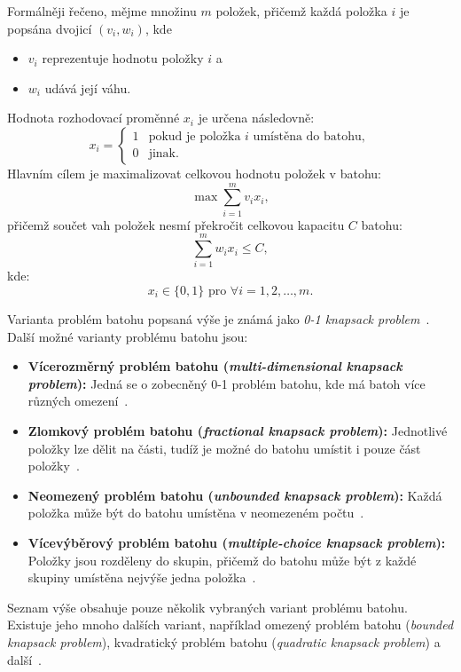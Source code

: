 Formálněji řečeno, mějme množinu $m$ položek, přičemž každá položka $i$ je popsána dvojicí $\left( v_i, w_i \right)$, kde
\begin{itemize}
    \item $v_i$ reprezentuje hodnotu položky $i$ a
    \item $w_i$ udává její váhu.
\end{itemize}
Hodnota rozhodovací proměnné $x_i$ je určena následovně:
\begin{equation*}
    x_i =
    \begin{cases}
        1 & \text{pokud je položka } i \text{ umístěna do batohu}, \\
        0 & \text{jinak}.
    \end{cases}    
\end{equation*}
Hlavním cílem je maximalizovat celkovou hodnotu položek v batohu:
\begin{equation*}
    \max \sum_{i=1}^{m} v_i x_i,
\end{equation*}
přičemž součet vah položek nesmí překročit celkovou kapacitu $C$ batohu:
\begin{equation} \label{eq:knapsack-capacity}
    \sum_{i=1}^{m} w_i x_i \leq C,
\end{equation}
kde:
\begin{equation*}
    x_i \in \{0,1\} \text{ pro } \forall i = 1,2,\dots,m.
\end{equation*}

Varianta problém batohu popsaná výše je známá jako \emph{0-1 knapsack problem}~\cite{knapsack01-survey}. 
Další možné varianty problému batohu jsou:
\begin{itemize}
    \item \textbf{Vícerozměrný problém batohu (\emph{multi-dimensional knapsack problem}):} Jed\-ná se o zobecněný 0-1 problém batohu, kde má batoh více různých omezení~\cite{multidimensional-knapsack}.
    \item \textbf{Zlomkový problém batohu (\emph{fractional knapsack problem}):} Jednotlivé položky lze dělit na části, tudíž je možné do batohu umístit i pouze část položky~\cite{IntroductionToAlgorithms}.
    \item \textbf{Neomezený problém batohu (\emph{unbounded knapsack problem}):} Každá položka může být do batohu umístěna v neomezeném počtu~\cite{unbounded-knapsack}.
    \item \textbf{Vícevýběrový problém batohu (\emph{multiple-choice knapsack problem}):} Položky jsou rozděleny do skupin, přičemž do batohu může být z každé skupiny umístěna nejvýše jedna položka~\cite{knapsack-problems}.
\end{itemize}
Seznam výše obsahuje pouze několik vybraných variant problému batohu. 
Existuje jeho mnoho dalších variant, například omezený problém batohu (\emph{bounded knapsack problem}), kvadratický problém batohu (\emph{quadratic knapsack problem}) a další~\cite{knapsack-problems,knapsack-problems-overview-I,knapsack-problems-overview-II}.

